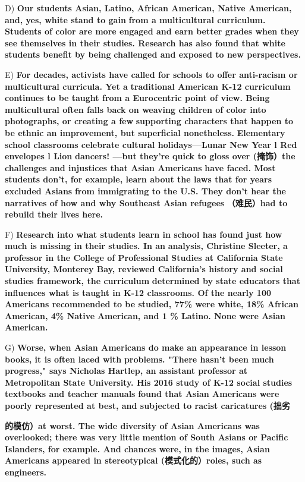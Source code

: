 \documentclass[UTF8,11pt]{ctexart}
\begin{document}
D) \textbf{Our students Asian, Latino, African American, Native American, and, yes, white stand to gain} \textbf{from a multicultural curriculum. Students of color are more engaged and earn better grades when they} \textbf{see themselves in their studies. Research has also found that white students benefit by being} \textbf{challenged and exposed to new perspectives.}


E) \textbf{For decades, activists have called for schools to offer anti-racism or multicultural curricula. Yet a} \textbf{traditional American K-12 curriculum continues to be taught from a Eurocentric point of view. Being} \textbf{multicultural often falls back on weaving children of color into photographs, or creating a few} \textbf{supporting characters that happen to be ethnic an improvement, but superficial nonetheless.} \textbf{Elementary school classrooms celebrate cultural holidays—Lunar New Year l Red envelopes l Lion} \textbf{dancers! —but they're quick to gloss over (掩饰）the challenges and injustices that Asian Americans} \textbf{have faced. Most students don't, for example, learn about the laws that for years excluded Asians} \textbf{from immigrating to the U.S. They don't hear the narratives of how and why Southeast Asian refugees} \textbf{（难民）had to rebuild their lives here.}


F) \textbf{Research into what students learn in school has found just how much is missing in their studies. In an} \textbf{analysis, Christine Sleeter, a professor in the College of Professional Studies at California State} \textbf{University, Monterey Bay, reviewed California's history and social studies framework, the curriculum} \textbf{determined by state educators that influences what is taught in K-12 classrooms. Of the nearly 100} \textbf{Americans recommended to be studied, 77\% were white, 18\% African American, 4\% Native} \textbf{American, and 1 \% Latino. None were Asian American.}


G) \textbf{Worse, when Asian Americans do make an appearance in lesson books, it is often laced with} \textbf{problems. "There hasn't been much progress," says Nicholas Hartlep, an assistant professor at} \textbf{Metropolitan State University. His 2016 study of K-12 social studies textbooks and teacher manuals} \textbf{found that Asian Americans were poorly represented at best, and subjected to racist caricatures (拙劣}


\textbf{的模仿）at worst. The wide diversity of Asian Americans was overlooked; there was very little} \textbf{mention of South Asians or Pacific Islanders, for example. And chances were, in the images, Asian} \textbf{Americans appeared in stereotypical (模式化的）roles, such as engineers.}
\end{document}
